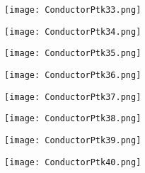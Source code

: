 \documentclass[pdf]{beamer}
\begin{document}
\begin{frame}
\begin{figure}[!h]
\centering
\texttt{[image: ConductorPtk33.png]}
\end{figure}
\end{frame}

\begin{frame}
\begin{figure}[!h]
\centering
\texttt{[image: ConductorPtk34.png]}
\end{figure}
\end{frame}

\begin{frame}
\begin{figure}[!h]
\centering
\texttt{[image: ConductorPtk35.png]}
\end{figure}
\end{frame}

\begin{frame}
\begin{figure}[!h]
\centering
\texttt{[image: ConductorPtk36.png]}
\end{figure}
\end{frame}

\begin{frame}
\begin{figure}[!h]
\centering
\texttt{[image: ConductorPtk37.png]}
\end{figure}
\end{frame}

\begin{frame}
\begin{figure}[!h]
\centering
\texttt{[image: ConductorPtk38.png]}
\end{figure}
\end{frame}

\begin{frame}
\begin{figure}[!h]
\centering
\texttt{[image: ConductorPtk39.png]}
\end{figure}
\end{frame}

\begin{frame}
\begin{figure}[!h]
\centering
\texttt{[image: ConductorPtk40.png]}
\end{figure}
\end{frame}
\end{document}
